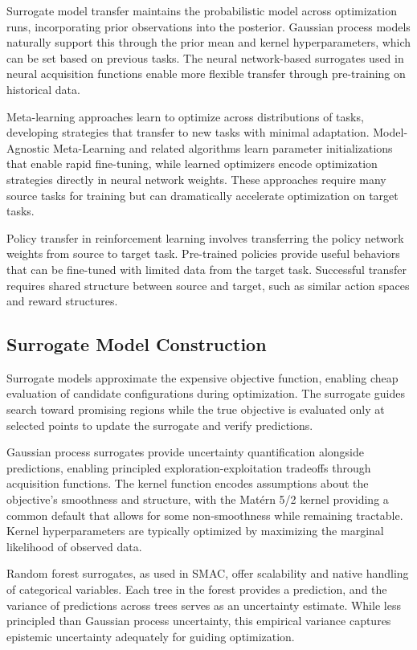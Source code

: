 Surrogate model transfer maintains the probabilistic model across optimization runs, incorporating prior observations into the posterior. Gaussian process models naturally support this through the prior mean and kernel hyperparameters, which can be set based on previous tasks. The neural network-based surrogates used in neural acquisition functions enable more flexible transfer through pre-training on historical data.

Meta-learning approaches learn to optimize across distributions of tasks, developing strategies that transfer to new tasks with minimal adaptation. Model-Agnostic Meta-Learning and related algorithms learn parameter initializations that enable rapid fine-tuning, while learned optimizers encode optimization strategies directly in neural network weights. These approaches require many source tasks for training but can dramatically accelerate optimization on target tasks.

Policy transfer in reinforcement learning involves transferring the policy network weights from source to target task. Pre-trained policies provide useful behaviors that can be fine-tuned with limited data from the target task. Successful transfer requires shared structure between source and target, such as similar action spaces and reward structures.

\subsection{Surrogate Model Construction}
\label{subsec:surrogate_models}

Surrogate models approximate the expensive objective function, enabling cheap evaluation of candidate configurations during optimization. The surrogate guides search toward promising regions while the true objective is evaluated only at selected points to update the surrogate and verify predictions.

Gaussian process surrogates provide uncertainty quantification alongside predictions, enabling principled exploration-exploitation tradeoffs through acquisition functions. The kernel function encodes assumptions about the objective's smoothness and structure, with the Mat\'ern 5/2 kernel providing a common default that allows for some non-smoothness while remaining tractable. Kernel hyperparameters are typically optimized by maximizing the marginal likelihood of observed data.

Random forest surrogates, as used in SMAC, offer scalability and native handling of categorical variables. Each tree in the forest provides a prediction, and the variance of predictions across trees serves as an uncertainty estimate. While less principled than Gaussian process uncertainty, this empirical variance captures epistemic uncertainty adequately for guiding optimization.

